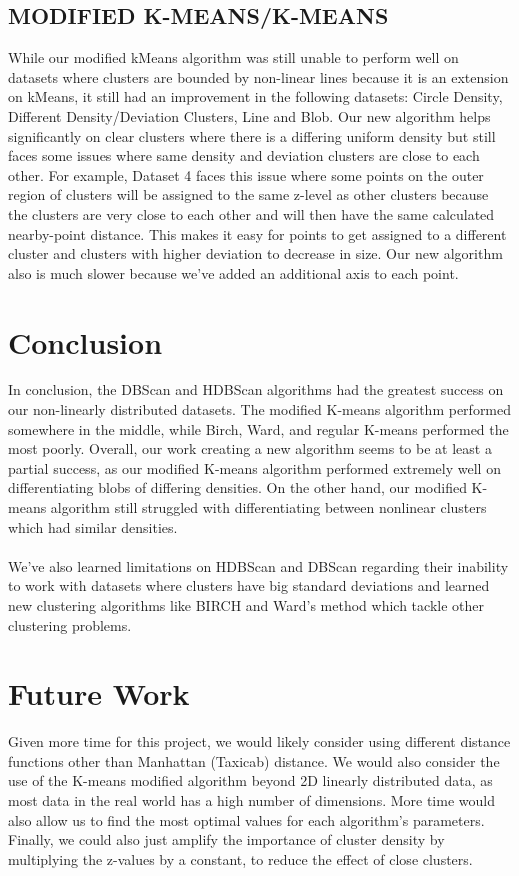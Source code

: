 \documentclass{aa}
\begin{document}
\subsection{\textbf{MODIFIED K-MEANS/K-MEANS}}
While our modified kMeans algorithm was still unable to perform well on datasets where clusters are bounded by non-linear lines because it is an extension on kMeans, it still had an improvement in the following datasets: Circle Density, Different Density/Deviation Clusters, Line and Blob. Our new algorithm helps significantly on clear clusters where there is a differing uniform density but still faces some issues where same density and deviation clusters are close to each other. For example, Dataset 4 faces this issue where some points on the outer region of clusters will be assigned to the same z-level as other clusters because the clusters are very close to each other and will then have the same calculated nearby-point distance. This makes it easy for points to get assigned to a different cluster and clusters with higher deviation to decrease in size. Our new algorithm also is much slower because we’ve added an additional axis to each point.

 \section{Conclusion}
In conclusion, the DBScan and HDBScan algorithms had the greatest success on our non-linearly distributed datasets. The modified K-means algorithm performed somewhere in the middle, while Birch, Ward, and regular K-means performed the most poorly. Overall, our work creating a new algorithm seems to be at least a partial success, as our modified K-means algorithm performed extremely well on differentiating blobs of differing densities. On the other hand, our modified K-means algorithm still struggled with differentiating between nonlinear clusters which had similar densities.
\\\\
We’ve also learned limitations on HDBScan and DBScan regarding their inability to work with datasets where clusters have big standard deviations and learned new clustering algorithms like BIRCH and Ward’s method which tackle other clustering problems.
\section{Future Work}

Given more time for this project, we would likely consider using different distance functions other than Manhattan (Taxicab) distance. We would also consider the use of the K-means modified algorithm beyond 2D linearly distributed data, as most data in the real world has a high number of dimensions. More time would also allow us to find the most optimal values for each algorithm’s parameters. Finally, we could also just amplify the importance of cluster density by multiplying the z-values by a constant, to reduce the effect of close clusters.
\end{document}
